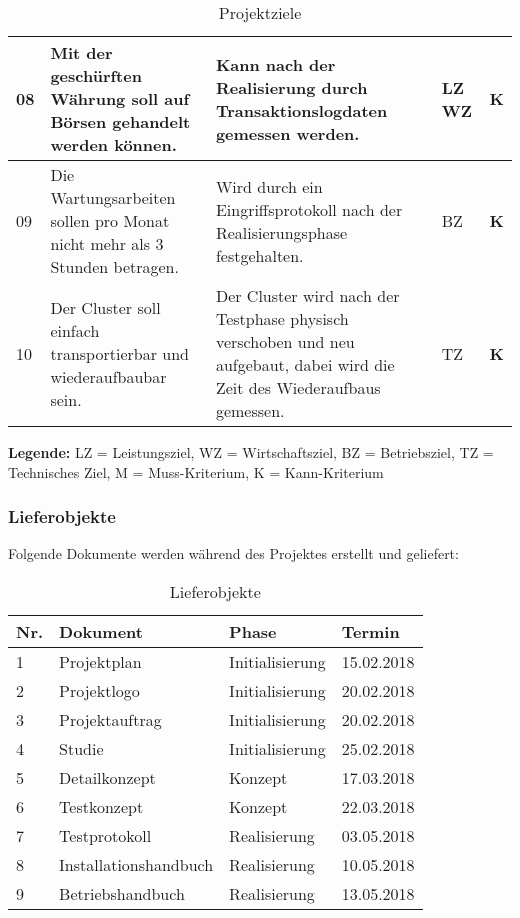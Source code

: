 \begin{table}[H]
\begin{tabular}[t]{p{0.7cm}|p{6.1cm}p{6.1cm} >{\centering}p{0.6cm}c}
08 & Mit der geschürften Währung soll auf Börsen gehandelt werden können. & Kann nach der Realisierung durch Transaktionslogdaten gemessen werden. & LZ \newline WZ & \textbf{K} \\\hline
09 & Die Wartungsarbeiten sollen pro Monat nicht mehr als 3 Stunden betragen. & Wird durch ein Eingriffsprotokoll nach der Realisierungsphase festgehalten. & BZ & \textbf{K} \\\hline
10 & Der Cluster soll einfach transportierbar und wiederaufbaubar sein. & Der Cluster wird nach der Testphase physisch verschoben und neu aufgebaut, dabei wird die Zeit des Wiederaufbaus gemessen. & TZ & \textbf{K}\\\hline
\end{tabular}
\caption{Projektziele}
\end{table}

\textbf{Legende:} LZ = Leistungsziel, WZ = Wirtschaftsziel, BZ = Betriebsziel, TZ = Technisches Ziel, \newline M = Muss-Kriterium, K = Kann-Kriterium

\subsubsection{Lieferobjekte}
Folgende Dokumente werden während des Projektes erstellt und geliefert:

\begin{table}[H]
\begin{tabular}[t]{p{0.5cm}p{6.5cm}p{6.5cm}p{1.8cm}}
\hline
\rowcolor{heading}\textbf{Nr.} & \textbf{Dokument} & \textbf{Phase} & \textbf{Termin} \\\hline
1 & Projektplan & Initialisierung & 15.02.2018 \\\hline
2 & Projektlogo & Initialisierung & 20.02.2018 \\\hline
3 & Projektauftrag & Initialisierung & 20.02.2018 \\\hline
4 & Studie & Initialisierung & 25.02.2018 \\\hline
5 & Detailkonzept & Konzept & 17.03.2018 \\\hline
6 & Testkonzept & Konzept & 22.03.2018 \\\hline
7 & Testprotokoll & Realisierung & 03.05.2018 \\\hline
8 & Installationshandbuch & Realisierung & 10.05.2018 \\\hline
9 & Betriebshandbuch & Realisierung & 13.05.2018 \\\hline
\end{tabular}
\caption{Lieferobjekte}
\end{table}


 
